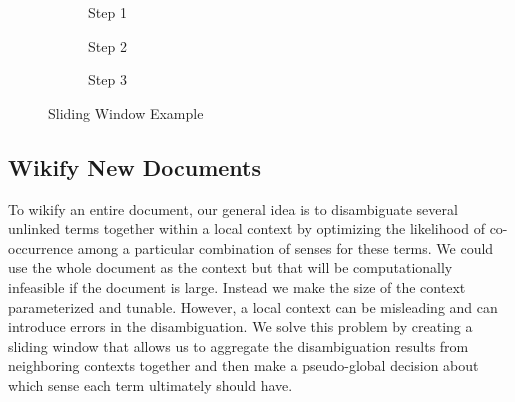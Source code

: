 \begin{figure}[!ht]
\centering
\begin{subfigure}[h]{0.8\columnwidth}
\centering
{}
\caption{Step 1}
\label{fig:sw1}
\end{subfigure}
\begin{subfigure}[h]{0.8\columnwidth}
\centering
{}
\caption{Step 2}
\label{fig:sw2}
\end{subfigure}
\begin{subfigure}[h]{0.8\columnwidth}
\centering
{}
\caption{Step 3}
\label{fig:sw3}
\end{subfigure}
\caption{Sliding Window Example}
\label{fig:sw}
\end{figure}

\subsection{Wikify New Documents}
\label{sec:wikify}


To wikify an entire document, our general idea is to
disambiguate several unlinked terms together within
a local context by optimizing the likelihood of co-occurrence among
a particular combination of senses for these terms. We could use
the whole document as the context but that will be computationally infeasible if
the document is large.
Instead we make the size of the context parameterized and tunable.
However, a local context can be misleading and can introduce errors in the
disambiguation. We solve this problem by creating a sliding window
that allows us to aggregate the disambiguation results from neighboring contexts
together and then make a pseudo-global decision about which sense each term
ultimately should have.


